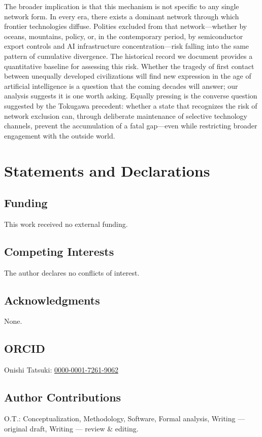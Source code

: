 \documentclass[pdflatex,sn-basic]{sn-jnl}
\theoremstyle{thmstyleone}%
\theoremstyle{thmstyletwo}%
\theoremstyle{thmstylethree}%
\begin{document}
The broader implication is that this mechanism is not specific to any single network form. In every era, there exists a dominant network through which frontier technologies diffuse. Polities excluded from that network---whether by oceans, mountains, policy, or, in the contemporary period, by semiconductor export controls and AI infrastructure concentration---risk falling into the same pattern of cumulative divergence. The historical record we document provides a quantitative baseline for assessing this risk. Whether the tragedy of first contact between unequally developed civilizations will find new expression in the age of artificial intelligence is a question that the coming decades will answer; our analysis suggests it is one worth asking. Equally pressing is the converse question suggested by the Tokugawa precedent: whether a state that recognizes the risk of network exclusion can, through deliberate maintenance of selective technology channels, prevent the accumulation of a fatal gap---even while restricting broader engagement with the outside world.

\section*{Statements and Declarations}

\subsection*{Funding}
This work received no external funding.

\subsection*{Competing Interests}
The author declares no conflicts of interest.

\subsection*{Acknowledgments}
None.

\subsection*{ORCID}
Onishi Tatsuki: \href{https://orcid.org/0000-0001-7261-9062}{0000-0001-7261-9062}

\subsection*{Author Contributions}
O.T.: Conceptualization, Methodology, Software, Formal analysis, Writing --- original draft, Writing --- review \& editing.
\end{document}
